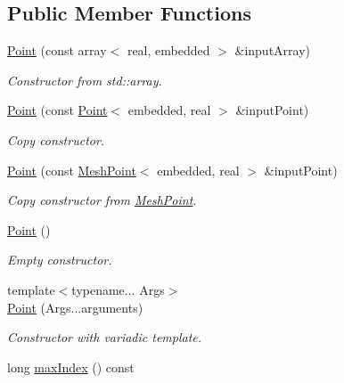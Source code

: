 \subsection*{Public Member Functions}
\begin{DoxyCompactItemize}
\item 
\hyperlink{class_point_a1dff5286bb0a775c7db78320da11f3d4}{Point} (const array$<$ real, embedded $>$ \&input\+Array)\hypertarget{class_point_a1dff5286bb0a775c7db78320da11f3d4}{}\label{class_point_a1dff5286bb0a775c7db78320da11f3d4}

\begin{DoxyCompactList}\small\item\em Constructor from std\+::array. \end{DoxyCompactList}\item 
\hyperlink{class_point_a5c9c38f9f77cd9089a3a5cadedfee70c}{Point} (const \hyperlink{class_point}{Point}$<$ embedded, real $>$ \&input\+Point)\hypertarget{class_point_a5c9c38f9f77cd9089a3a5cadedfee70c}{}\label{class_point_a5c9c38f9f77cd9089a3a5cadedfee70c}

\begin{DoxyCompactList}\small\item\em Copy constructor. \end{DoxyCompactList}\item 
\hyperlink{class_point_ab4cb590995d17da1537e35f32da3e498}{Point} (const \hyperlink{class_mesh_point}{Mesh\+Point}$<$ embedded, real $>$ \&input\+Point)\hypertarget{class_point_ab4cb590995d17da1537e35f32da3e498}{}\label{class_point_ab4cb590995d17da1537e35f32da3e498}

\begin{DoxyCompactList}\small\item\em Copy constructor from \hyperlink{class_mesh_point}{Mesh\+Point}. \end{DoxyCompactList}\item 
\hyperlink{class_point_ab1a9e6eedb684c43816dc50c586df933}{Point} ()\hypertarget{class_point_ab1a9e6eedb684c43816dc50c586df933}{}\label{class_point_ab1a9e6eedb684c43816dc50c586df933}

\begin{DoxyCompactList}\small\item\em Empty constructor. \end{DoxyCompactList}\item 
{\footnotesize template$<$typename... Args$>$ }\\\hyperlink{class_point_ade059d5c3bf5513c9aaf6bc698f0bb24}{Point} (Args...\+arguments)
\begin{DoxyCompactList}\small\item\em Constructor with variadic template. \end{DoxyCompactList}\item 
long \hyperlink{class_point_a4a87c9a65f2bcd966f1df83a870f117f}{max\+Index} () const \hypertarget{class_point_a4a87c9a65f2bcd966f1df83a870f117f}{}\label{class_point_a4a87c9a65f2bcd966f1df83a870f117f}


\end{DoxyCompactItemize}
